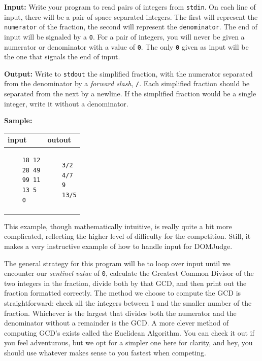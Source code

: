 \documentclass[a4paper]{article}
\begin{document}
\textbf{Input:} Write your program to read pairs of integers from \texttt{stdin}. On each line of input, there will be a pair of space separated integers. The first will represent the \texttt{numerator} of the fraction, the second will represent the \texttt{denominator}. The end of input will be signaled by a \texttt{0}. For a pair of integers, you will never be given a numerator or denominator with a value of \texttt{0}. The only \texttt{0} given as input will be the one that signals the end of input. 


\textbf{Output:} Write to \texttt{stdout} the simplified fraction, with the numerator separated from the denominator by a \textit{forward slash}, \texttt{/}. Each simplified fraction should be separated from the next by a newline. If the simplified fraction would be a single integer, write it without a denominator.  

\textbf{Sample:}

\begin{tabular}{|p{}|p{}|}
    \hline
    \textbf{input} & \textbf{outout} \\
    \hline
    \begin{verbatim}
    18 12
    28 49
    99 11
    13 5
    0
    \end{verbatim} &
    \begin{verbatim}
    3/2
    4/7
    9
    13/5
    \end{verbatim} \\
    \hline
\end{tabular}

This example, though mathematically intuitive, is really quite a bit more complicated, reflecting the higher level of difficulty for the competition. Still, it makes a very instructive example of how to handle input for DOMJudge. 

The general strategy for this program will be to loop over input until we encounter our \textit{sentinel value} of \texttt{0}, calculate the Greatest Common Divisor of the two integers in the fraction, divide both by that GCD, and then print out the fraction formatted correctly. The method we choose to compute the GCD is straightforward: check all the integers between 1 and the smaller number of the fraction. Whichever is the largest that divides both the numerator and the denominator without a remainder is the GCD. A more clever method of computing GCD's exists called the Euclidean Algorithm. You can check it out if you feel adventurous, but we opt for a simpler one here for clarity, and hey, you should use whatever makes sense to you fastest when competing. 
\newpage
\end{document}
